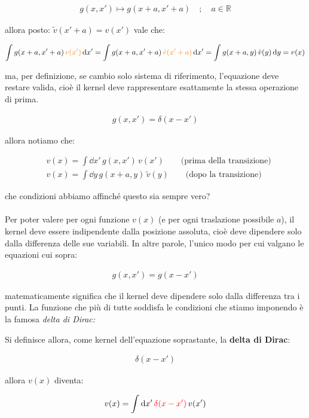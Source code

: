 \begin{align*}
	g(x, x') \mapsto g(x+a, x' +a) \quad  ; \quad a \in \mathbb{R}
\end{align*}

	allora posto: $\tilde{v}(x' + a) = v(x')$ vale che:

\begin{align*}
	\int g(x+a, x' +a) \, \textcolor{orange}{v(x')} \, \dd x' = \int g(x+a, x' +a) \, \textcolor{orange}{\tilde{v}(x' + a)} \, \dd x' = \int  g(x+a, y) \, \tilde{v}(y) \, \dd y = v(x)
\end{align*}

	ma, per definizione, se cambio solo sistema di riferimento, l'equazione deve restare valida, cioè il kernel deve rappresentare esattamente la stessa operazione di prima.
	
\begin{align*}
	g(x, x') = \delta(x-x')
\end{align*} 

	allora notiamo che:

\begin{nb}
\begin{align*}
	&v(x) = \int \dd x' \, g(x, x') \, v(x')	\qquad \text{(prima della transizione)} \\
	&v(x) = \int \dd y \,  g(x+a, y) \, \tilde{v}(y) \qquad \text{(dopo la transizione)}
\end{align*}
\end{nb}
	
	che condizioni abbiamo affinché questo sia sempre vero?
	\\
	\\
	Per poter valere per ogni funzione $v(x)$ (e per ogni traslazione possibile $a$), il kernel deve essere indipendente dalla posizione assoluta, cioè deve dipendere solo dalla differenza delle sue variabili. In altre parole, l'unico modo per cui valgano le equazioni cui sopra:

\begin{align*}
	g(x, x') = g(x-x')
\end{align*}

	matematicamente significa che il kernel deve dipendere solo dalla differenza tra i punti. La funzione che più di tutte soddisfa le condizioni che stiamo imponendo è la famosa \textit{delta di Dirac:}

\begin{mydef}
	
	Si definisce allora, come kernel dell'equazione soprastante, la \textbf{delta di Dirac}:

\begin{align*}
	\delta(x-x')
\end{align*}
	
	allora $v(x)$ diventa:

\begin{align*}
	v(x) = \int \dd x' \,\textcolor{red}{ \delta(x-x')} \, v(x')
\end{align*}

\end{mydef}
	
